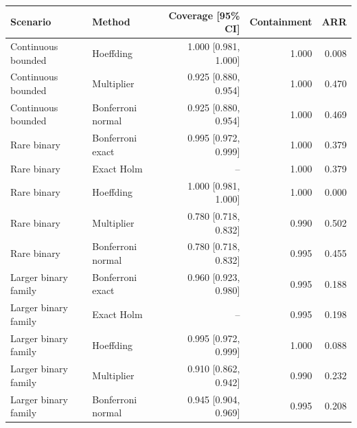 \begin{tabular}{llrrr}
\toprule
Scenario & Method & Coverage [95\% CI] & Containment & ARR \\
\midrule
Continuous bounded & Hoeffding & 1.000 [0.981, 1.000] & 1.000 & 0.008 \\
Continuous bounded & Multiplier & 0.925 [0.880, 0.954] & 1.000 & 0.470 \\
Continuous bounded & Bonferroni normal & 0.925 [0.880, 0.954] & 1.000 & 0.469 \\
Rare binary & Bonferroni exact & 0.995 [0.972, 0.999] & 1.000 & 0.379 \\
Rare binary & Exact Holm & -- & 1.000 & 0.379 \\
Rare binary & Hoeffding & 1.000 [0.981, 1.000] & 1.000 & 0.000 \\
Rare binary & Multiplier & 0.780 [0.718, 0.832] & 0.990 & 0.502 \\
Rare binary & Bonferroni normal & 0.780 [0.718, 0.832] & 0.995 & 0.455 \\
Larger binary family & Bonferroni exact & 0.960 [0.923, 0.980] & 0.995 & 0.188 \\
Larger binary family & Exact Holm & -- & 0.995 & 0.198 \\
Larger binary family & Hoeffding & 0.995 [0.972, 0.999] & 1.000 & 0.088 \\
Larger binary family & Multiplier & 0.910 [0.862, 0.942] & 0.990 & 0.232 \\
Larger binary family & Bonferroni normal & 0.945 [0.904, 0.969] & 0.995 & 0.208 \\
\bottomrule
\end{tabular}
